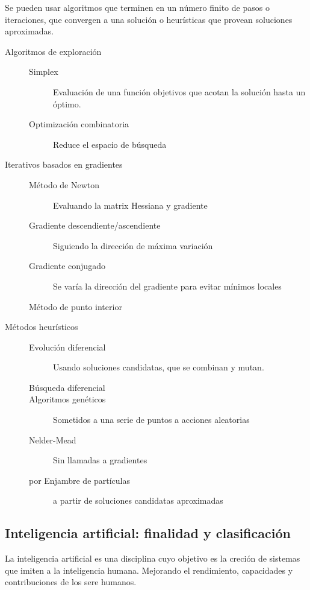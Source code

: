         Se pueden usar algoritmos que terminen en un número finito de pasos o iteraciones, que convergen a una solución o heurísticas que provean soluciones aproximadas.
        \begin{description}
            \item[Algoritmos de exploración]\begin{description}
                \item[Simplex] Evaluación de una función objetivos que acotan la solución hasta un óptimo.
                \item[Optimización combinatoria] Reduce el espacio de búsqueda
            \end{description}
            \item[Iterativos basados en gradientes] \begin{description}
                \item[Método de Newton] Evaluando la matrix Hessiana y gradiente
                \item[Gradiente descendiente/ascendiente] Siguiendo la dirección de máxima variación
                \item[Gradiente conjugado] Se varía la dirección del gradiente para evitar mínimos locales
                \item[Método de punto interior]
            \end{description}
            \item[Métodos heurísticos]\begin{description}
                \item[Evolución diferencial] Usando soluciones candidatas, que se combinan y mutan.
                \item[Búsqueda diferencial]
                \item[Algoritmos genéticos] Sometidos a una serie de puntos a acciones aleatorias
                \item[Nelder-Mead] Sin llamadas a gradientes
                \item[por Enjambre de partículas] a partir de soluciones candidatas aproximadas
            \end{description}
        \end{description}

\subsection{Inteligencia artificial: finalidad y clasificación}
    La inteligencia artificial es una disciplina cuyo objetivo es la creción de sistemas que imiten a la inteligencia humana. Mejorando el rendimiento, capacidades y contribuciones de los sere humanos.

